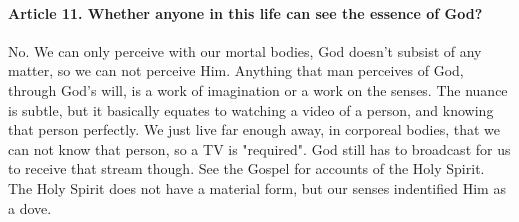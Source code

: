 \documentclass{ucetd}
\begin{document}
\paragraph{Article 11. Whether anyone in this life can see the essence of God?}
No. We can only perceive with our mortal bodies, God doesn't subsist of any matter, so we can not perceive Him. Anything that man perceives of God, through God's will, is a work of imagination or a work on the senses. The nuance is subtle, but it basically equates to watching a video of a person, and knowing that person perfectly. We just live far enough away, in corporeal bodies, that we can not know that person, so a TV is "required". God still has to broadcast for us to receive that stream though. See the Gospel for accounts of the Holy Spirit. The Holy Spirit does not have a material form, but our senses indentified Him as a dove.
\end{document}
